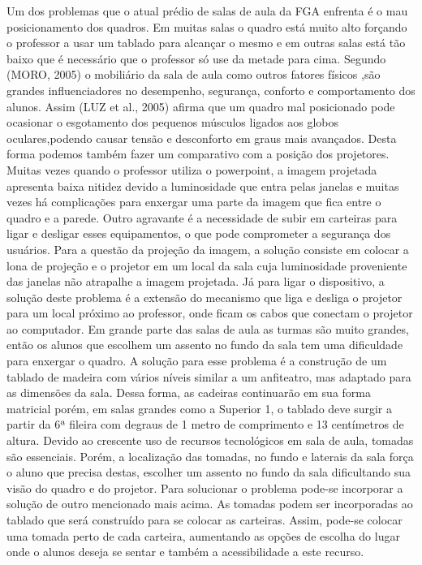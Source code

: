Um dos problemas que o atual prédio de salas de aula da FGA enfrenta é o mau posicionamento dos quadros. Em muitas salas o quadro está muito alto forçando o professor a usar um tablado para alcançar o mesmo e em outras salas está tão baixo que é necessário que o professor só use da metade para cima. Segundo (MORO, 2005) o mobiliário da sala de aula como outros fatores físicos ,são grandes influenciadores no desempenho, segurança, conforto e comportamento dos alunos. Assim (LUZ et al., 2005) afirma que um quadro mal posicionado pode ocasionar o esgotamento dos pequenos músculos ligados aos globos oculares,podendo causar tensão e desconforto em graus mais avançados.
Desta forma podemos também fazer um comparativo com a posição dos projetores. Muitas vezes quando o professor utiliza o powerpoint, a imagem projetada apresenta baixa nitidez devido a luminosidade que entra pelas janelas e muitas vezes há complicações para enxergar uma parte da imagem que fica entre o quadro e a parede. Outro agravante é a necessidade de subir em carteiras para ligar e desligar esses equipamentos, o que pode comprometer a segurança dos usuários.
Para a questão da projeção da imagem, a solução consiste em colocar a lona de projeção e o projetor em um local da sala cuja luminosidade proveniente das janelas não atrapalhe a imagem projetada. Já para ligar o dispositivo, a solução deste problema é a extensão do mecanismo que liga e desliga o projetor para um local próximo ao professor, onde ficam os cabos que conectam o projetor ao computador.
Em grande parte das salas de aula as turmas são muito grandes, então os alunos que escolhem um assento no fundo da sala tem uma dificuldade para enxergar o quadro. A solução para esse problema é a construção de um tablado de madeira com vários níveis similar a um anfiteatro, mas adaptado para as dimensões da sala. Dessa forma, as cadeiras continuarão em sua forma matricial porém, em salas grandes como a Superior 1, o tablado deve surgir a partir da 6ª fileira com degraus de 1 metro de comprimento e 13 centímetros de altura.
Devido ao crescente uso de recursos tecnológicos em sala de aula, tomadas são essenciais. Porém, a localização das tomadas, no fundo e laterais da sala força o aluno que precisa destas, escolher um assento no fundo da sala dificultando sua visão do quadro e do projetor. Para solucionar o problema pode-se incorporar a solução de outro mencionado mais acima. As tomadas podem ser incorporadas ao tablado que será construído para se colocar as carteiras. Assim, pode-se colocar uma tomada perto de cada carteira, aumentando as opções de escolha do lugar onde o alunos deseja se sentar e também a acessibilidade a este recurso.
